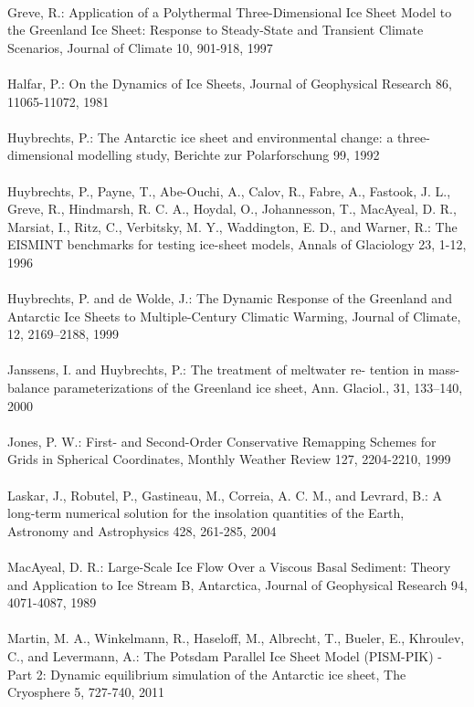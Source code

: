 \documentclass{article}
\begin{document}
\\
Greve, R.: Application of a Polythermal Three-Dimensional Ice Sheet Model to the Greenland Ice Sheet: Response to Steady-State and Transient Climate Scenarios, Journal of Climate 10, 901-918, 1997\\
\\
Halfar, P.: On the Dynamics of Ice Sheets, Journal of Geophysical Research 86, 11065-11072, 1981\\
\\
Huybrechts, P.: The Antarctic ice sheet and environmental change: a three-dimensional modelling study, Berichte zur Polarforschung 99, 1992\\
\\
Huybrechts, P., Payne, T., Abe-Ouchi, A., Calov, R., Fabre, A., Fastook, J. L., Greve, R., Hindmarsh, R. C. A., Hoydal, O., Johannesson, T., MacAyeal, D. R., Marsiat, I., Ritz, C., Verbitsky, M. Y., Waddington, E. D., and Warner, R.: The EISMINT benchmarks for testing ice-sheet models, Annals of Glaciology 23, 1-12, 1996\\
\\
Huybrechts, P. and de Wolde, J.: The Dynamic Response of the Greenland and Antarctic Ice Sheets to Multiple-Century Climatic Warming, Journal of Climate, 12, 2169–2188, 1999\\
\\
Janssens, I. and Huybrechts, P.: The treatment of meltwater re- tention in mass-balance parameterizations of the Greenland ice sheet, Ann. Glaciol., 31, 133–140, 2000\\
\\
Jones, P. W.: First- and Second-Order Conservative Remapping Schemes for Grids in Spherical Coordinates, Monthly Weather Review 127, 2204-2210, 1999\\
\\
Laskar, J., Robutel, P., Gastineau, M., Correia, A. C. M., and Levrard, B.: A long-term numerical solution for the insolation quantities of the Earth, Astronomy and Astrophysics 428, 261-285, 2004\\
\\
MacAyeal, D. R.: Large-Scale Ice Flow Over a Viscous Basal Sediment: Theory and Application to Ice Stream B, Antarctica, Journal of Geophysical Research 94, 4071-4087, 1989\\
\\
Martin, M. A., Winkelmann, R., Haseloff, M., Albrecht, T., Bueler, E., Khroulev, C., and Levermann, A.: The Potsdam Parallel Ice Sheet Model (PISM-PIK) - Part 2: Dynamic equilibrium simulation of the Antarctic ice sheet, The Cryosphere 5, 727-740, 2011\\
\end{document}
